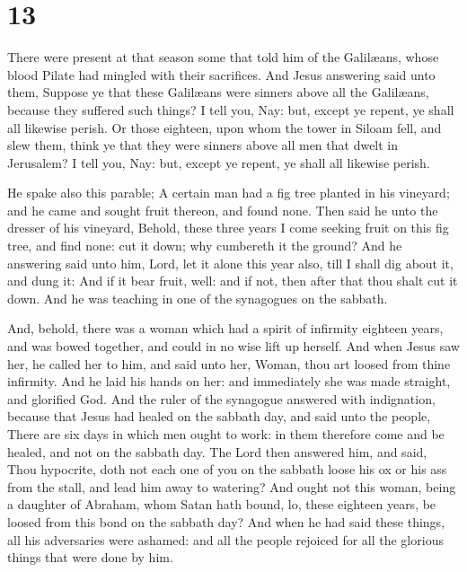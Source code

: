 \hypertarget{section-12}{%
\section{13}\label{section-12}}

 There were present at that season some that told him of the
Galilæans, whose blood Pilate had mingled with their sacrifices.
 And Jesus answering said unto them, Suppose ye that these
Galilæans were sinners above all the Galilæans, because they suffered
such things?  I tell you, Nay: but, except ye repent, ye
shall all likewise perish.  Or those eighteen, upon whom the
tower in Siloam fell, and slew them, think ye that they were sinners
above all men that dwelt in Jerusalem?  I tell you, Nay:
but, except ye repent, ye shall all likewise perish.

 He spake also this parable; A certain man had a fig tree
planted in his vineyard; and he came and sought fruit thereon, and found
none.  Then said he unto the dresser of his vineyard,
Behold, these three years I come seeking fruit on this fig tree, and
find none: cut it down; why cumbereth it the ground?  And he
answering said unto him, Lord, let it alone this year also, till I shall
dig about it, and dung it:  And if it bear fruit, well: and
if not, then after that thou shalt cut it down.  And he was
teaching in one of the synagogues on the sabbath.

 And, behold, there was a woman which had a spirit of
infirmity eighteen years, and was bowed together, and could in no wise
lift up herself.  And when Jesus saw her, he called her to
him, and said unto her, Woman, thou art loosed from thine infirmity.
 And he laid his hands on her: and immediately she was made
straight, and glorified God.  And the ruler of the
synagogue answered with indignation, because that Jesus had healed on
the sabbath day, and said unto the people, There are six days in which
men ought to work: in them therefore come and be healed, and not on the
sabbath day.  The Lord then answered him, and said, Thou
hypocrite, doth not each one of you on the sabbath loose his ox or his
ass from the stall, and lead him away to watering?  And
ought not this woman, being a daughter of Abraham, whom Satan hath
bound, lo, these eighteen years, be loosed from this bond on the sabbath
day?  And when he had said these things, all his
adversaries were ashamed: and all the people rejoiced for all the
glorious things that were done by him.

